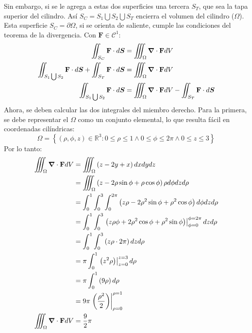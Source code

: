 \begin{solution}
    Sin embargo, si se le agrega a estas dos superficies una tercera $S_T$, que sea la tapa superior del cilindro.
    Así $S_C = S_1 \bigcup S_2 \bigcup S_T$ encierra el volumen del cilindro ($\Omega$). Esta superficie $S_C = \partial\Omega$, si se
    orienta de saliente, cumple las condiciones del teorema de la divergencia. Con $\mathbf{F} \in \mathcal{C}^1$:
    \begin{align*}
        \iint_{S_C} \mathbf{F} \cdot d\boldsymbol{S} &= \iiint_{\Omega} \grad \cdot \mathbf{F} dV\\
        \iint_{S_1 \bigcup S_2} \mathbf{F} \cdot d\boldsymbol{S} + \iint_{S_T} \mathbf{F} \cdot d\boldsymbol{S}&= \iiint_{\Omega} \grad \cdot \mathbf{F} dV\\
        \iint_{S_1 \bigcup S_2} \mathbf{F} \cdot d\boldsymbol{S} &= \iiint_{\Omega} \grad \cdot \mathbf{F} dV - \iint_{S_T} \mathbf{F} \cdot d\boldsymbol{S}
    \end{align*}
    Ahora, se deben calcular las dos integrales del miembro derecho. Para la primera, se debe representar el $\Omega$ 
    como un conjunto elemental, lo que resulta fácil en coordenadas cilíndricas:
    \begin{equation*}
    \Omega = \left\{(\rho,\phi,z) \in \mathbb{R}^3: 0\leq\rho\leq1 \land 0\leq\phi\leq2\pi \land 0\leq z \leq 3 \right\}
    \end{equation*}
    Por lo tanto:
    \begin{align*}
        \iiint_{\Omega} \grad \cdot \mathbf{F} dV &= \iiint_{\Omega} \left(z-2y+x\right)dxdydz\\
        &=\iiint_{\Omega} \left(z-2\rho\sin{\phi}+\rho\cos{\phi}\right)\rho d\phi dz d\rho\\
        &=\int_{0}^{1} \int_{0}^{3} \int_{0}^{2\pi} \left(z\rho-2\rho^2\sin{\phi}+\rho^2\cos{\phi}\right) d\phi dz d\rho\\
        &= \int_{0}^{1} \int_{0}^{3}  \left.\left(z\rho\phi+2\rho^2\cos{\phi}+\rho^2\sin{\phi}\right)\right|_{\phi=0}^{\phi=2\pi} dz d\rho\\
        &= \int_{0}^{1} \int_{0}^{3}  \left(z\rho\cdot2\pi\right) dz d\rho\\
        &= \pi\int_{0}^{1}  \left.\left(z^2\rho\right)\right|_{z=0}^{z=3} d\rho\\
        &= \pi\int_{0}^{1}  \left(9\rho\right) d\rho\\
        &= 9\pi \left.\left(\frac{\rho^2}{2}\right)\right|_{\rho=0}^{\rho=1}\\
        \iiint_{\Omega} \grad \cdot \mathbf{F} dV&= \frac{9}{2}\pi

\end{align*}
\end{solution}
